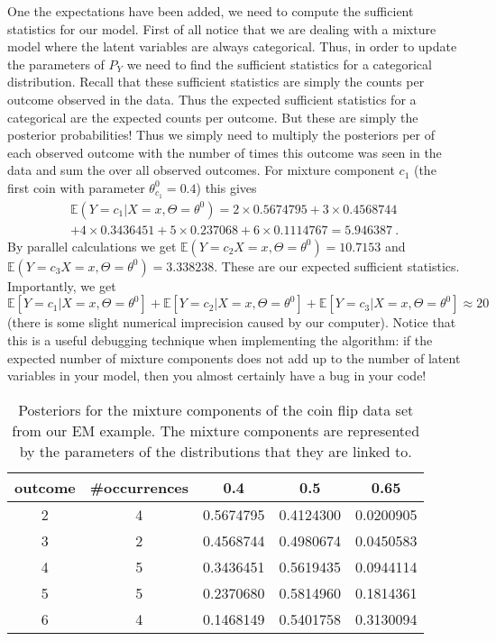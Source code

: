 \documentclass[a4paper,11pt,leqno]{report}\usepackage[]{graphicx}\usepackage[]{color}
\newcommand{\E}{\mathbb{E}}
\begin{document}
One the expectations have been added, we need to compute the sufficient statistics for our model. First of all notice that we are dealing with
a mixture model where the latent variables are always categorical. Thus, in order to update the parameters of $ P_{Y} $ we need to find the
sufficient statistics for a categorical distribution. Recall that these sufficient statistics are simply the counts per outcome observed in
the data. Thus the expected sufficient statistics for a categorical are the expected counts per outcome. But these are simply the posterior
probabilities! Thus we simply need to multiply the posteriors per of each observed outcome with the number of times this outcome was
seen in the data and sum the over all observed outcomes. For mixture component $ c_{1} $ (the first coin with parameter $ \theta^{0}_{c_{1}} = 0.4 $) this gives
\begin{align}
\E(Y = c_{1}|X=x,\Theta= \theta^{0}) = 2 \times 0.5674795 + 3 \times 0.4568744 \\ 
+ 4 \times 0.3436451 + 5 \times 0.237068 + 6 \times 0.1114767 = 5.946387 \nonumber \ .
\end{align}
By parallel calculations we get $ \E(Y = c_{2}X=x,\Theta= \theta^{0}) = 10.7153 $ and $ \E(Y = c_{3}X=x,\Theta= \theta^{0}) = 3.338238 $. 
These are our expected sufficient statistics. Importantly, we get 
$ \E[Y = c_{1}|X=x,\Theta= \theta^{0}] + \E[Y = c_{2}|X=x,\Theta= \theta^{0}] + \E[Y = c_{3}|X=x,\Theta= \theta^{0}] \approx 20 $ (there is some slight numerical imprecision
caused by our computer). Notice that this is a useful debugging technique when implementing the algorithm: if the expected number of mixture components
does not add up to the number of latent variables in your model, then you almost certainly have a bug in your code!

\begin{table}
\center

\begin{tabular}{c|c|c|c|c}
\hline
outcome & \#occurrences & 0.4 & 0.5 & 0.65\\
\hline
2 & 4 & 0.5674795 & 0.4124300 & 0.0200905\\
\hline
3 & 2 & 0.4568744 & 0.4980674 & 0.0450583\\
\hline
4 & 5 & 0.3436451 & 0.5619435 & 0.0944114\\
\hline
5 & 5 & 0.2370680 & 0.5814960 & 0.1814361\\
\hline
6 & 4 & 0.1468149 & 0.5401758 & 0.3130094\\
\hline
\end{tabular}


\caption{Posteriors for the mixture components of the coin flip data set from our EM example. The mixture components are 
represented by the parameters of the distributions that they are linked to.}
\label{tab:posteriors}
\end{table}
\end{document}
